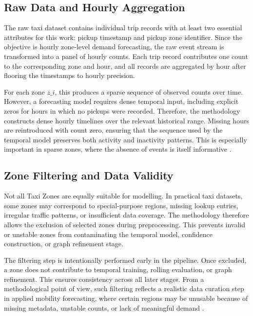 \documentclass[12pt,a4paper]{report}
\begin{document}
\subsection{Raw Data and Hourly Aggregation}

The raw taxi dataset contains individual trip records with at least two essential attributes for this work: pickup timestamp and pickup zone identifier. Since the objective is hourly zone-level demand forecasting, the raw event stream is transformed into a panel of hourly counts. Each trip record contributes one count to the corresponding zone and hour, and all records are aggregated by hour after flooring the timestamps to hourly precision.

For each zone \(z\_i\), this produces a sparse sequence of observed counts over time. However, a forecasting model requires dense temporal input, including explicit zeros for hours in which no pickups were recorded. Therefore, the methodology constructs dense hourly timelines over the relevant historical range. Missing hours are reintroduced with count zero, ensuring that the sequence used by the temporal model preserves both activity and inactivity patterns. This is especially important in sparse zones, where the absence of events is itself informative \cite{zhuang2022sparse,lyu2021bigdata}.

\subsection{Zone Filtering and Data Validity}

Not all Taxi Zones are equally suitable for modelling. In practical taxi datasets, some zones may correspond to special-purpose regions, missing lookup entries, irregular traffic patterns, or insufficient data coverage. The methodology therefore allows the exclusion of selected zones during preprocessing. This prevents invalid or unstable zones from contaminating the temporal model, confidence construction, or graph refinement stage.

The filtering step is intentionally performed early in the pipeline. Once excluded, a zone does not contribute to temporal training, rolling evaluation, or graph refinement. This ensures consistency across all later stages. From a methodological point of view, such filtering reflects a realistic data curation step in applied mobility forecasting, where certain regions may be unusable because of missing metadata, unstable counts, or lack of meaningful demand \cite{lyu2021bigdata}.
\end{document}
